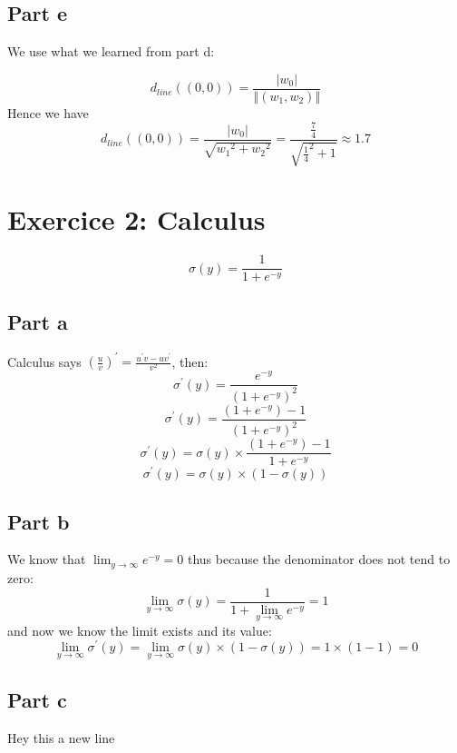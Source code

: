 \documentclass[a4paper, 10pt]{article}
\begin{document}
\subsection{Part e}
We use what we learned from part d:

$$
d_{line}((0, 0)) = \frac{\left\vert w_0\right\vert}{\left\Vert(w_1, w_2)\right\Vert}
$$
Hence we have
$$
d_{line}((0, 0)) = \frac{\left\vert w_0\right\vert}{\sqrt{{w_1}^2 + {w_2}^2}} = \frac{\frac{7}{4}}{\sqrt{{\frac{1}{4}}^2+1}} \approx 1.7
$$

\section{Exercice 2: Calculus}
$$
\sigma(y) = \frac{1}{1+e^{-y}}
$$
\subsection{Part a}
Calculus says $\left(\frac{u}{v}\right)^{\prime} = \frac{u^{\prime}v - uv^{\prime}}{v^2}$, then:
$$
\sigma^{\prime}(y) = \frac{e^{-y}}{\left(1+e^{-y}\right)^2}
$$
$$
\sigma^{\prime}(y) = \frac{(1 + e^{-y}) - 1}{\left(1+e^{-y}\right)^2}
$$
$$
\sigma^{\prime}(y) = \sigma(y) \times \frac{(1 + e^{-y}) - 1}{1+e^{-y}}
$$
$$
\sigma^{\prime}(y) = \sigma(y) \times (1 - \sigma(y))
$$

\subsection{Part b}
We know that $\lim_{y\to\infty} e^{-y} = 0$ thus because the denominator does not tend to zero:
$$
\lim_{y\to\infty} \sigma(y) = \frac{1}{1+\lim_{y\to\infty}e^{-y}} = 1
$$
and now we know the limit exists and its value:
$$
\lim_{y\to\infty}\sigma^{\prime}(y) = \lim_{y\to\infty} \sigma(y) \times (1-\sigma(y)) = 1 \times (1-1) = 0
$$

\subsection{Part c}

Hey this a new line
\end{document}
